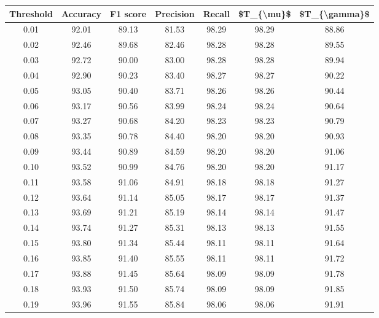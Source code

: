 \begin{tabular}{|c|c|c|c|c|c|c|}
\hline
 Threshold &  Accuracy &  F1 score &  Precision &  Recall &  \$T\_\{\textbackslash mu\}\$ &  \$T\_\{\textbackslash gamma\}\$ \\
\hline
      0.01 &     92.01 &     89.13 &      81.53 &   98.29 &      98.29 &         88.86 \\
      0.02 &     92.46 &     89.68 &      82.46 &   98.28 &      98.28 &         89.55 \\
      0.03 &     92.72 &     90.00 &      83.00 &   98.28 &      98.28 &         89.94 \\
      0.04 &     92.90 &     90.23 &      83.40 &   98.27 &      98.27 &         90.22 \\
      0.05 &     93.05 &     90.40 &      83.71 &   98.26 &      98.26 &         90.44 \\
      0.06 &     93.17 &     90.56 &      83.99 &   98.24 &      98.24 &         90.64 \\
      0.07 &     93.27 &     90.68 &      84.20 &   98.23 &      98.23 &         90.79 \\
      0.08 &     93.35 &     90.78 &      84.40 &   98.20 &      98.20 &         90.93 \\
      0.09 &     93.44 &     90.89 &      84.59 &   98.20 &      98.20 &         91.06 \\
      0.10 &     93.52 &     90.99 &      84.76 &   98.20 &      98.20 &         91.17 \\
      0.11 &     93.58 &     91.06 &      84.91 &   98.18 &      98.18 &         91.27 \\
      0.12 &     93.64 &     91.14 &      85.05 &   98.17 &      98.17 &         91.37 \\
      0.13 &     93.69 &     91.21 &      85.19 &   98.14 &      98.14 &         91.47 \\
      0.14 &     93.74 &     91.27 &      85.31 &   98.13 &      98.13 &         91.55 \\
      0.15 &     93.80 &     91.34 &      85.44 &   98.11 &      98.11 &         91.64 \\
      0.16 &     93.85 &     91.40 &      85.55 &   98.11 &      98.11 &         91.72 \\
      0.17 &     93.88 &     91.45 &      85.64 &   98.09 &      98.09 &         91.78 \\
      0.18 &     93.93 &     91.50 &      85.74 &   98.09 &      98.09 &         91.85 \\
      0.19 &     93.96 &     91.55 &      85.84 &   98.06 &      98.06 &         91.91 \\

\end{tabular}
